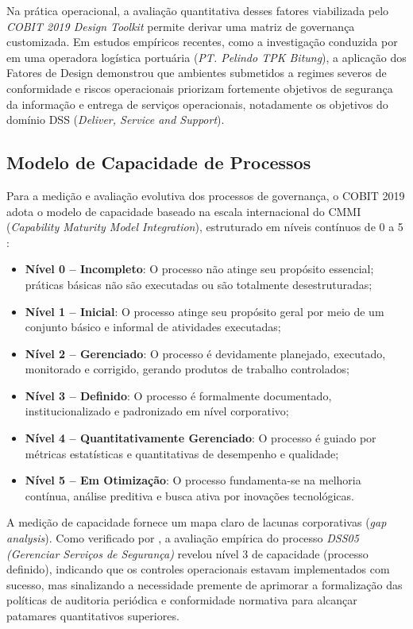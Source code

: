 Na prática operacional, a avaliação quantitativa desses fatores viabilizada pelo \textit{COBIT 2019 Design Toolkit} permite derivar uma matriz de governança customizada. Em estudos empíricos recentes, como a investigação conduzida por  em uma operadora logística portuária (\textit{PT. Pelindo TPK Bitung}), a aplicação dos Fatores de Design demonstrou que ambientes submetidos a regimes severos de conformidade e riscos operacionais priorizam fortemente objetivos de segurança da informação e entrega de serviços operacionais, notadamente os objetivos do domínio DSS (\textit{Deliver, Service and Support}).

\subsection{Modelo de Capacidade de Processos}

Para a medição e avaliação evolutiva dos processos de governança, o COBIT 2019 adota o modelo de capacidade baseado na escala internacional do CMMI (\textit{Capability Maturity Model Integration}), estruturado em níveis contínuos de 0 a 5 \cite{isaca2019framework}:

\begin{itemize}
    \item \textbf{Nível 0 -- Incompleto}: O processo não atinge seu propósito essencial; práticas básicas não são executadas ou são totalmente desestruturadas;
    \item \textbf{Nível 1 -- Inicial}: O processo atinge seu propósito geral por meio de um conjunto básico e informal de atividades executadas;
    \item \textbf{Nível 2 -- Gerenciado}: O processo é devidamente planejado, executado, monitorado e corrigido, gerando produtos de trabalho controlados;
    \item \textbf{Nível 3 -- Definido}: O processo é formalmente documentado, institucionalizado e padronizado em nível corporativo;
    \item \textbf{Nível 4 -- Quantitativamente Gerenciado}: O processo é guiado por métricas estatísticas e quantitativas de desempenho e qualidade;
    \item \textbf{Nível 5 -- Em Otimização}: O processo fundamenta-se na melhoria contínua, análise preditiva e busca ativa por inovações tecnológicas.
\end{itemize}

A medição de capacidade fornece um mapa claro de lacunas corporativas (\textit{gap analysis}). Como verificado por , a avaliação empírica do processo \textit{DSS05 (Gerenciar Serviços de Segurança)} revelou nível 3 de capacidade (processo definido), indicando que os controles operacionais estavam implementados com sucesso, mas sinalizando a necessidade premente de aprimorar a formalização das políticas de auditoria periódica e conformidade normativa para alcançar patamares quantitativos superiores.

